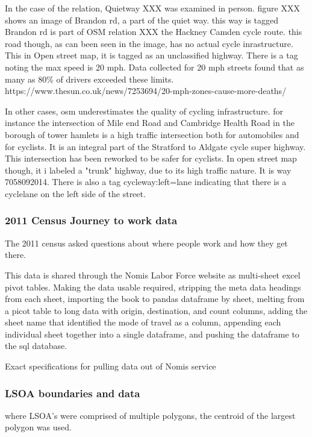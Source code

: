 \documentclass[11pt]{article} %
\begin{document}
In the case of the relation, Quietway XXX was examined in person. figure XXX shows an image of Brandon rd, a part of the quiet way. this way is tagged
Brandon rd is part of OSM relation XXX the Hackney Camden cycle route.  this road though, as can been seen in the image, has no actual cycle inrastructure. This in Open street map, it is tagged as an unclassified highway. There is a tag noting the max speed is 20 mph. Data collected for 20 mph streets found that as many as 80\% of drivers exceeded these limits. 
https://www.thesun.co.uk/news/7253694/20-mph-zones-cause-more-deaths/

In other cases, osm underestimates the quality of cycling infrastructure. for instance the intersection of Mile end Road and Cambridge Health Road in the borough of tower hamlets is a high traffic intersection both for automobiles and for cyclists. It is an integral part of the Stratford to Aldgate cycle super highway. This intersection has been reworked to be safer for cyclists. In open street map though, it i labeled a "trunk" highway, due to its high traffic nature. It is way 7058092014. There is also a tag cycleway:left=lane indicating that there is a cyclelane on the left side of the street. 


\subsubsection{2011 Census Journey to work data}

The 2011 census asked questions about where people work and how they get there. 

This data is shared through the Nomis Labor Force website as multi-sheet excel pivot tables. Making the data usable required, stripping the meta data headings from each sheet, importing the book to pandas dataframe by sheet, melting from a picot table to long data with origin, destination, and count columns, adding the sheet name that identified the mode of travel as a column, appending each individual sheet together into a single dataframe, and pushing the dataframe to the sql database. 

Exact specifications for pulling data out of Nomis service

\subsubsection{LSOA boundaries and data}

where LSOA's were comprised of multiple polygons, the centroid of the largest polygon was used. 
\end{document}
